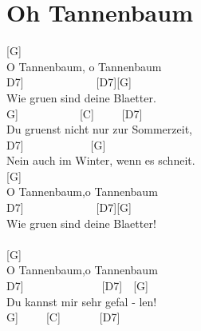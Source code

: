 \documentclass[
  letterpaper,
]{scrbook}
\begin{document}
\hypertarget{oh-tannenbaum}{%
\chapter{Oh Tannenbaum}\label{oh-tannenbaum}}

{[}G{]}~~~~~~~~~~\\
O Tannenbaum, o Tannenbaum\\
\hspace*{0.333em}\hspace*{0.333em}\hspace*{0.333em}{[}D7{]}~~~~~~~~~~~~~{[}D7{]}{[}G{]}~~~~~~\\
Wie gruen sind deine Blaetter.\\
\hspace*{0.333em}\hspace*{0.333em}{[}G{]}~~~~~~~~~~~{[}C{]}~~~~~{[}D7{]}~~~~~\\
Du gruenst nicht nur zur Sommerzeit,\\
\hspace*{0.333em}\hspace*{0.333em}\hspace*{0.333em}\hspace*{0.333em}{[}D7{]}~~~~~~~~~~~~{[}G{]}~~~~~\\
Nein auch im Winter, wenn es schneit.\\
{[}G{]}~~~~~~\\
O Tannenbaum,o Tannenbaum\\
\hspace*{0.333em}\hspace*{0.333em}\hspace*{0.333em}{[}D7{]}~~~~~~~~~~~~~{[}D7{]}{[}G{]}~~~~~\\
Wie gruen sind deine Blaetter!\\
\hspace*{0.333em}\hspace*{0.333em}\\
{[}G{]}~~\\
O Tannenbaum,o Tannenbaum\\
\hspace*{0.333em}\hspace*{0.333em}{[}D7{]}~~~~~~~~~~~~~~{[}D7{]}~~{[}G{]}~~~~~~\\
Du kannst mir sehr gefal - len!\\
\hspace*{0.333em}\hspace*{0.333em}\hspace*{0.333em}{[}G{]}~~~~~{[}C{]}~~~~~~~{[}D7{]}~~~~~~~\\
\end{document}
